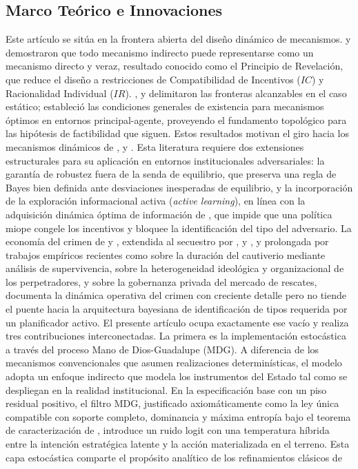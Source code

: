 \documentclass[review,authoryear,12pt]{elsarticle}
\theoremstyle{plain}
\theoremstyle{definition}
\newcommand{\1}{\mathbf{1}}
\begin{document}
\subsection{Marco Teórico e Innovaciones}\label{subsec:framing}

Este artículo se sitúa en la frontera abierta del diseño dinámico de mecanismos. \citet{Gibbard1973} y \citet{Myerson1979IC,Myerson1981} demostraron que todo mecanismo indirecto puede representarse como un mecanismo directo y veraz, resultado conocido como el Principio de Revelación, que reduce el diseño a restricciones de Compatibilidad de Incentivos ($IC$) y Racionalidad Individual ($IR$). \citet{MyersonSatterthwaite1983}, \citet{Rochet1987} y \citet{RochetChone1998} delimitaron las fronteras alcanzables en el caso estático; \citet{KadanRenySwinkels2017} estableció las condiciones generales de existencia para mecanismos óptimos en entornos principal-agente, proveyendo el fundamento topológico para las hipótesis de factibilidad que siguen. Estos resultados motivan el giro hacia los mecanismos dinámicos de \citet{CourtyLi2000}, \citet{EsoSzentes2007} y \citet{PavanSegalToikka2014}. Esta literatura requiere dos extensiones estructurales para su aplicación en entornos institucionales adversariales: la garantía de robustez fuera de la senda de equilibrio, que preserva una regla de Bayes bien definida ante desviaciones inesperadas de equilibrio, y la incorporación de la exploración informacional activa (\textit{active learning}), en línea con la adquisición dinámica óptima de información de \citet{Zhong2022}, que impide que una política miope congele los incentivos y bloquee la identificación del tipo del adversario. La economía del crimen de \citet{Becker1968} y \citet{Ehrlich1973}, extendida al secuestro por \citet{Selten1977Kidnapping}, \citet{Iqbal2017Kidnapping} y \citet{Mejia2000Secuestro}, y prolongada por trabajos empíricos recientes como \citet{Detotto2014Ransom} sobre la duración del cautiverio mediante análisis de supervivencia, \citet{Forest2012Kidnapping} sobre la heterogeneidad ideológica y organizacional de los perpetradores, y \citet{Shortland2019Kidnap} sobre la gobernanza privada del mercado de rescates, documenta la dinámica operativa del crimen con creciente detalle pero no tiende el puente hacia la arquitectura bayesiana de identificación de tipos requerida por un planificador activo. El presente artículo ocupa exactamente ese vacío y realiza tres contribuciones interconectadas. La primera es la implementación estocástica a través del proceso Mano de Dios-Guadalupe (MDG). A diferencia de los mecanismos convencionales que asumen realizaciones determinísticas, el modelo adopta un enfoque indirecto que modela los instrumentos del Estado tal como se despliegan en la realidad institucional. En la especificación base con un piso residual positivo, el filtro MDG, justificado axiomáticamente como la ley única compatible con soporte completo, dominancia y máxima entropía bajo el teorema de caracterización de \citet{Jaynes1957Information}, introduce un ruido logit con una temperatura híbrida entre la intención estratégica latente y la acción materializada en el terreno. Esta capa estocástica comparte el propósito analítico de los refinamientos clásicos de 
\end{document}
